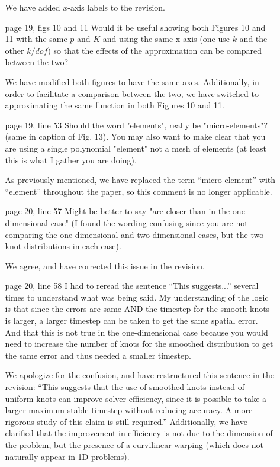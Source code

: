 \documentclass[10pt]{article}
\newcommand{\note}[1]{{\color{violet}#1}}
\begin{document}
\begin{enumerate}
\begin{enumerate}
\note{We have added $x$-axis labels to the revision.}

\item [page 19, figs 10 and 11] Would it be useful showing both Figures 10 and 11 with the same $p$ and $K$ and using the same x-axis (one use $k$ and the other $k / dof$) so that the effects of the approximation can be compared between the two?

\note{We have modified both figures to have the same axes.  Additionally, in order to facilitate a comparison between the two, we have switched to approximating the same function in both Figures 10 and 11.  }


\item [page 19, line 53] Should the word "elements", really be "micro-elements"?  (same in caption of Fig. 13). You may also want to make clear that you are using a single polynomial "element" not a mesh of elements (at least this is what I gather you are doing).

\note{As previously mentioned, we have replaced the term ``micro-element'' with ``element'' throughout the paper, so this comment is no longer applicable.}

\item [page 20, line 57] Might be better to say "are closer than in the one-dimensional case" (I found the wording confusing since you are not comparing the one-dimensional and two-dimensional cases, but the two knot distributions in each case).

\note{We agree, and have corrected this issue in the revision.}

\item [page 20, line 58] I had to reread the sentence ``This suggests...'' several times to understand what was being said. My understanding of the logic is that since the errors are same AND the timestep for the smooth knots is larger, a larger timestep can be taken to get the same spatial error. And that this is not true in the one-dimensional case because you would need to increase the number of knots for the smoothed distribution to get the same error and thus needed a smaller timestep.  

\note{We apologize for the confusion, and have restructured this sentence in the revision: ``This suggests that the use of smoothed knots instead of uniform knots can improve solver efficiency, since it is possible to take a larger maximum stable timestep without reducing accuracy.  A more rigorous study of this claim is still required.''  Additionally, we have clarified that the improvement in efficiency is not due to the dimension of the problem, but the presence of a curvilinear warping (which does not naturally appear in 1D problems).}


\end{enumerate}
\end{enumerate}
\end{document}
